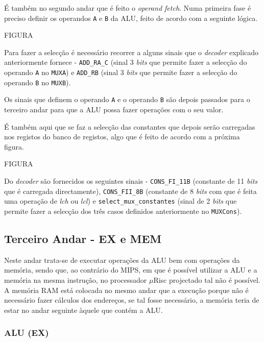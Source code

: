 \documentclass[11pt]{article}
\numberwithin{equation}{section}
\begin{document}
É também no segundo andar que é feito o \textit{operand fetch}. Numa primeira fase é preciso definir os operandos \texttt{A} e \texttt{B} da ALU, feito de acordo com a seguinte lógica.

FIGURA 

Para fazer a selecção é necessário recorrer a alguns sinais que o \textit{decoder} explicado anteriormente fornece - \texttt{ADD\_RA\_C} (sinal 3 \textit{bits} que permite fazer a selecção do operando \texttt{A} no \texttt{MUXA}) e \texttt{ADD\_RB} (sinal 3 \textit{bits} que permite fazer a selecção do operando \texttt{B} no \texttt{MUXB}). 


Os sinais que definem o operando \texttt{A} e o operando \texttt{B} são depois passados para o terceiro andar para que a ALU possa fazer operações com o seu valor.

É também aqui que se faz a selecção das constantes que depois serão carregadas nos registos do banco de registos, algo que é feito de acordo com a próxima figura.

FIGURA

Do \textit{decoder} são fornecidos os seguintes sinais - \texttt{CONS\_FI\_11B} (constante de 11 \textit{bits} que é carregada directamente), \texttt{CONS\_FII\_8B} (constante de 8 \textit{bits} com que é feita uma operação de \textit{lch} ou \textit{lcl}) e \texttt{select\_mux\_constantes}  (sinal de 2 \textit{bits} que permite fazer a selecção dos três casos definidos anteriormente no \texttt{MUXCons}).

\subsection{Terceiro Andar - EX e MEM}

Neste andar trata-se de executar operações da ALU bem com operações da memória, sendo que, ao contrário do MIPS, em que é possível utilizar a ALU e a memória na mesma instrução, no processador $\mu$Risc projectado tal não é possível. A memória RAM está colocada no mesmo andar que a execução porque não é necessário fazer cálculos dos endereços, se tal fosse necessário, a memória teria de estar no andar seguinte àquele que contém a ALU. 

\subsubsection{ALU (EX)}
\end{document}
